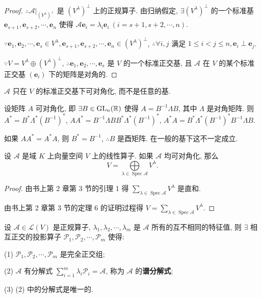 \documentclass[color=black,device=normal,lang=cn,mode=geye]{elegantnote}
\begin{document}
\begin{proof}
    $\therefore\mathcal{A}|_{(V^\lambda)^\perp}$ 是 $(V^\lambda)^\perp$ 上的正规算子. 由归纳假定, $\exists(V^\lambda)^\perp$ 的一个标准基 $\boldsymbol{e}_{s+1},\boldsymbol{e}_{s+2},\cdots,\boldsymbol{e}_n$ 使得 $\mathcal{A}\boldsymbol{e}_i=\lambda_i\boldsymbol{e}_i\ (i=s+1,s+2,\cdots,n)$.

    $\because\boldsymbol{e}_1,\boldsymbol{e}_2,\cdots,\boldsymbol{e}_s\in V^\lambda,\boldsymbol{e}_{s+1},\boldsymbol{e}_{s+2},\cdots,\boldsymbol{e}_n\in(V^\lambda)^\perp$, $\therefore\forall i,j$ 满足 $1\leq i<j\leq n,\boldsymbol{e}_i\perp\boldsymbol{e}_j$.

    $\because V=V^\lambda\oplus(V^\lambda)^\perp$, $\therefore\boldsymbol{e}_1,\boldsymbol{e}_2,\cdots,\boldsymbol{e}_s$ 是 $V$ 的一个标准正交基, 且 $\mathcal{A}$ 在 $V$ 的某个标准正交基 $(\boldsymbol{e}_i)$ 下的矩阵是对角的.
\end{proof}
\begin{note}
    $\mathcal{A}$ 只在 $V$ 的标准正交基下可对角化, 而不是任意的基.

    设矩阵 $A$ 可对角化, 即 $\exists B\in\operatorname{GL} _n(\mathbb{R})$ 使得 $A=B^{-1}\Lambda B$, 其中 $\Lambda$ 是对角矩阵. 则 $A^*=B^*\Lambda^*(B^{-1})^*$, $AA^*=B^{-1}\Lambda BB^*\Lambda^*(B^{-1})^*$, $A^*A=B^*\Lambda^*(B^{-1})^*B^{-1}\Lambda B$.

    如果 $AA^*=A^*A$, 则 $B^*=B^{-1}$, $\therefore B$ 是酉矩阵. 在一般的基下这不一定成立.
\end{note}
\begin{lemma}\label{l3.4}
    设 $\mathcal{A}$ 是域 $K$ 上向量空间 $V$ 上的线性算子. 如果 $\mathcal{A}$ 均可对角化, 那么
    \[V=\bigoplus\limits_{\lambda\in\operatorname{Spec}\mathcal{A}}V^\lambda.\]
\end{lemma}
\begin{proof}
    由书上第 2 章第 3 节的引理 1 得 $\sum\limits_{\lambda\in\operatorname{Spec}\mathcal{A}}V^\lambda$ 是直和.

    由书上第 2 章第 3 节的定理 6 的证明过程得 $V=\sum\limits_{\lambda\in\operatorname{Spec}\mathcal{A}}V^\lambda$.
\end{proof}
\begin{theorem}\label{t3.8}
    设 $\mathcal{A}\in\mathcal{L}(V)$ 是正规算子, $\lambda_1,\lambda_2,\cdots,\lambda_m$ 是 $\mathcal{A}$ 所有的互不相同的特征值, 则 $\exists$ 相互正交的投影算子 $\mathcal{P}_1,\mathcal{P}_2,\cdots,\mathcal{P}_m$ 使得:

    (1) $\mathcal{P}_1,\mathcal{P}_2,\cdots,\mathcal{P}_m$ 是完全正交组;

    (2) $\mathcal{A}$ 有分解式 $\sum\limits_{i=1}^m\lambda_i\mathcal{P}_i=\mathcal{A}$, 称为 $\mathcal{A}$ 的\textbf{谱分解式};

    (3) (2) 中的分解式是唯一的.
\end{theorem}
\end{document}
